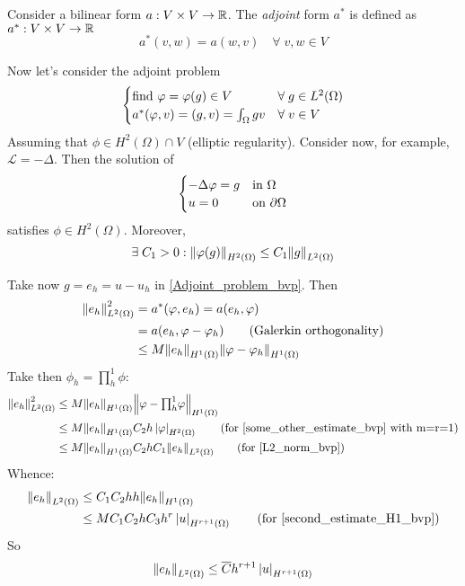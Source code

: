 \begin{definition}
    Consider a bilinear form \(a: V \times V \to \mathbb{R}\). The \textit{adjoint} form \(a^*\) is defined as \(a^*:V \times V \to \mathbb{R}\)
    \[
        a^*(v,w) = a(w,v) \quad \forall \; v,w \in V
    \]
\end{definition}
Now let's consider the adjoint problem 
\begin{equation}
    \begin{cases}
        \text{find } \varphi = \varphi(g) \in V & \forall \; g \in L^2(\Omega)\\ 
        a^*(\varphi,v) = (g,v) = \int_{\Omega} g v & \forall \; v \in V
    \end{cases}
    \label{Adjoint_problem_bvp}
\end{equation}
Assuming that \(\phi \in H^2(\Omega) \cap V\) (elliptic regularity). Consider now, for example, \(\mathcal{L} = -\Delta\). Then the solution of 
\begin{equation*}
    \begin{cases}
        -\Delta \varphi = g & \text{in } \Omega \\
        u = 0 & \text{on } \partial \Omega
    \end{cases}
\end{equation*}
satisfies \(\phi \in H^2(\Omega)\). Moreover,
\begin{equation}
    \exists \; C_1 > 0 : \norm{\varphi(g)}_{H^2(\Omega)} \leq C_1 \norm{g}_{L^2(\Omega)}  \label{L2_norm_bvp}
\end{equation}
    
Take now \(g = e_h = u-u_h\) in \eqref{Adjoint_problem_bvp}. Then
\begin{align*}
    \norm{e_h}^2_{L^2(\Omega)} &= a^*(\phi, e_h) = a(e_h, \phi) \\ 
    &= a(e_h, \phi-\phi_h) \tag{\txt{Galerkin orthogonality}} \\
    &\leq M\norm{e_h}_{H^1(\Omega)}\norm{\phi-\phi_h}_{H^1(\Omega)}
\end{align*}
Take then \(\phi_h = \prod_{h}^{1}\phi\):
\begin{align*}
    \norm{e_h}^2_{L^2(\Omega)} &\leq M\norm{e_h}_{H^1(\Omega)}\norm{\phi - {\textstyle \prod_{h}^{1}}\phi}_{H^1(\Omega)} \\
    &\leq M\honenorm{e_h}C_2 h\seminorm{\phi}{H^2(\Omega)} \tag{for \eqref{some_other_estimate_bvp} with m=r=1} \\
    &\leq M \honenorm{e_h} C_2 h C_1 \ltwonorm{e_h} \tag{for \eqref{L2_norm_bvp}}
\end{align*}
Whence: 
\begin{align*}
    \ltwonorm{e_h} &\leq C_1 C_2 h h \honenorm{e_h} \\
    &\leq M C_1 C_2 h C_3 h^r \seminorm{u}{H^{r+1}(\Omega)} \tag{for \eqref{second_estimate_H1_bvp}}
\end{align*}
So 
\begin{equation}
    \norm{e_h}_{L^2(\Omega)} \leq \overline{C} h^{r+1} \left\lvert u\right\rvert_{H^{r+1}(\Omega)}
\end{equation}